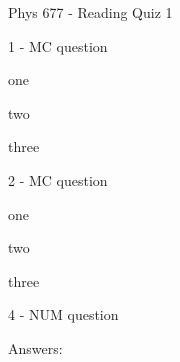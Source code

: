 \documentclass[letterpaper,10pt]{article}
\begin{document}
\begin{center}
{\Large Phys 677 - Reading Quiz 1}
\end{center}


\begin{compactenum}
    \begin{minipage}{\linewidth}
    \item 1 - MC question
    \begin{compactenum}
        \item one
        
        \item two
        
        \item three
        
    \end{compactenum}
    \end{minipage}

    \vspace{10pt}

    \begin{minipage}{\linewidth}
    \item 2 - MC question
    \begin{compactenum}
        \item one
        
        \item two
        
        \item three
        
    \end{compactenum}
    \end{minipage}

    \vspace{10pt}

    \begin{minipage}{\linewidth}
    \item 4 - NUM question
    
    \end{minipage}

    \vspace{10pt}

\end{compactenum}

\clearpage
Answers:
\end{document}
